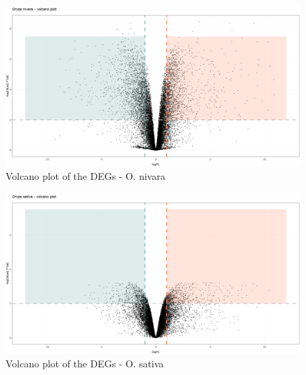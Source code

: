 \begin{figure}[htbp]
    \caption{Volcano plot of the DEGs - O. nivara}
    \label{fig:4.1-DEG-Volcano-Plot-Oryza_nivara}
    \includegraphics[width=\textwidth]{../../results/plots-and-tables/4.1-DEG-Volcano-Plot-Oryza_nivara}
\end{figure}

\begin{figure}[htbp]
    \caption{Volcano plot of the DEGs - O. sativa}
    \label{fig:4.1-DEG-Volcano-Plot-Oryza_sativa}
    \includegraphics[width=\textwidth]{../../results/plots-and-tables/4.1-DEG-Volcano-Plot-Oryza_sativa}
\end{figure}



